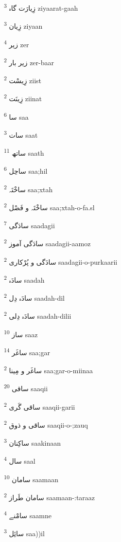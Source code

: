 \documentclass[12pt]{article}
\begin{document}
\begin{RTL}
\begin{multicols}{5}
{\ur زِیارَت گاہ}   \textsuperscript{3} ziyaarat-gaah

{\ur زِیان}   \textsuperscript{3} ziyaan

{\ur زیر}   \textsuperscript{4} zer

{\ur زیر بار}   \textsuperscript{2} zer-baar

{\ur زِیسْت}   \textsuperscript{2} ziist

{\ur زِینَت}   \textsuperscript{2} ziinat

{\ur سا}   \textsuperscript{6} saa

{\ur سات}   \textsuperscript{3} saat

{\ur ساتھ}   \textsuperscript{11} saath

{\ur ساحِل}   \textsuperscript{6} saa;hil

{\ur ساخْتَہ}   \textsuperscript{2} saa;xtah

{\ur ساخْتَہ و فَصْل}   \textsuperscript{2} saa;xtah-o-fa.sl

{\ur سادَگی}   \textsuperscript{7} saadagii

{\ur سادَگی آموز}   \textsuperscript{2} saadagii-aamoz

{\ur سادَگی و پُرْکاری}   \textsuperscript{2} saadagii-o-purkaarii

{\ur سادَہ}   \textsuperscript{2} saadah

{\ur سادَہ دِل}   \textsuperscript{2} saadah-dil

{\ur سادَہ دِلی}   \textsuperscript{2} saadah-dilii

{\ur ساز}   \textsuperscript{10} saaz

{\ur ساغَر}   \textsuperscript{14} saa;gar

{\ur ساغَر و مِینا}   \textsuperscript{2} saa;gar-o-miinaa

{\ur ساقی}   \textsuperscript{20} saaqii

{\ur ساقی گَری}   \textsuperscript{2} saaqii-garii

{\ur ساقی و ذوق}   \textsuperscript{2} saaqii-o-;zauq

{\ur ساکِنان}   \textsuperscript{3} saakinaan

{\ur سال}   \textsuperscript{4} saal

{\ur سامان}   \textsuperscript{10} saamaan

{\ur سامان طَراز}   \textsuperscript{2} saamaan-:taraaz

{\ur سامْنے}   \textsuperscript{4} saamne

{\ur سائِل}   \textsuperscript{3} saa))il


\end{multicols}
\end{RTL}
\end{document}
